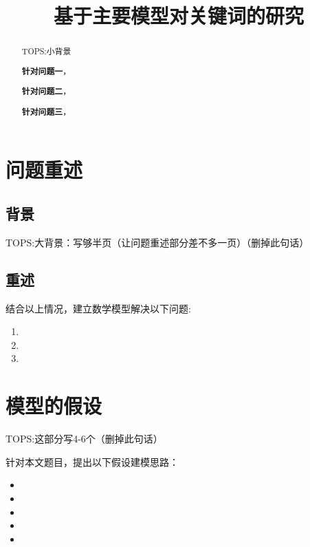 \documentclass[withoutpreface,bwprint]{cumcmthesis} %
\title{基于主要模型对关键词的研究}
\begin{document}
\maketitle%
\begin{abstract}


TOPS:小背景

\textbf{针对问题一}，
			
\textbf{针对问题二}，

\textbf{针对问题三}，

\end{abstract}

\section{问题重述}
\subsection{背景}

TOPS:大背景：写够半页（让问题重述部分差不多一页）（删掉此句话）

\subsection{重述}
结合以上情况，建立数学模型解决以下问题:

\begin{enumerate}
\item 	
	
\item 
	
\item 
\end{enumerate}

\newpage%
\section{模型的假设}
TOPS:这部分写4-6个（删掉此句话）

针对本文题目，提出以下假设建模思路：
	
\begin{itemize}
	\item 
	\item 
	\item 
	\item 
	\item
\end{itemize}
	
\end{document}
